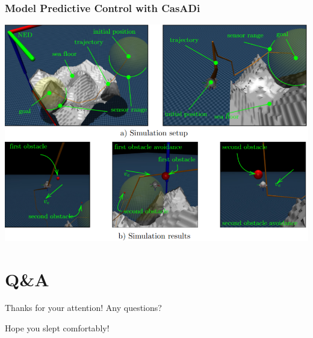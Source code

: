 \documentclass[9pt]{beamer}
\begin{document}
		\begin{frame}
			\frametitle{Model Predictive Control with CasADi}
			\begin{center}
				\includegraphics[width=0.9\linewidth, fbox]{images/mjc-odin4.png}
			\end{center}
		\end{frame}
	
	
	\section{Q\&A}


	

	

	
	\begin{frame}{Thanks for your attention! Any questions?}%
		\begin{center}
			\Huge Hope you slept comfortably!
		\end{center}
	\end{frame}
	
\end{document}
